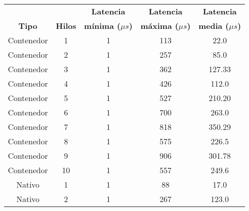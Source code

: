 \begin{table}[H]
    \centering
    \begin{tabular}{ | c | c | c | c | c | }
        \hline
                      &                & \textbf{Latencia}         & \textbf{Latencia}         & \textbf{Latencia}        \\
        \textbf{Tipo} & \textbf{Hilos} & \textbf{mínima ($\mu s$)} & \textbf{máxima ($\mu s$)} & \textbf{media ($\mu s$)} \\
        \hline
        Contenedor    & 1              & 1                         & 113                       & 22.0                     \\
        \hline
        Contenedor    & 2              & 1                         & 257                       & 85.0                     \\
        \hline
        Contenedor    & 3              & 1                         & 362                       & 127.33                   \\
        \hline
        Contenedor    & 4              & 1                         & 426                       & 112.0                    \\
        \hline
        Contenedor    & 5              & 1                         & 527                       & 210.20                   \\
        \hline
        Contenedor    & 6              & 1                         & 700                       & 263.0                    \\
        \hline
        Contenedor    & 7              & 1                         & 818                       & 350.29                   \\
        \hline
        Contenedor    & 8              & 1                         & 575                       & 226.5                    \\
        \hline
        Contenedor    & 9              & 1                         & 906                       & 301.78                   \\
        \hline
        Contenedor    & 10             & 1                         & 557                       & 249.6                    \\
        \hline
        Nativo        & 1              & 1                         & 88                        & 17.0                     \\
        \hline
        Nativo        & 2              & 1                         & 267                       & 123.0                    \\

\end{tabular}
\end{table}
